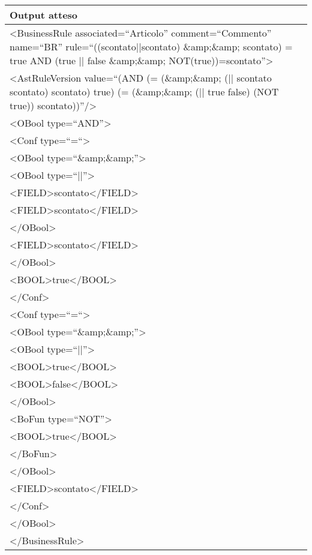 \begin{center}
\begin{tabular}{|p{11cm}|} \hline
\textbf{Output atteso}\\ \hline
\textless BusinessRule associated=``Articolo'' comment=``Commento'' name=``BR'' rule=``((scontato||scontato) \&amp;\&amp; scontato) = true AND (true || false \&amp;\&amp; NOT(true))=scontato''\textgreater \\
\textless AstRuleVersion value=``(AND (= (\&amp;\&amp; (|| scontato scontato) scontato) true) (= (\&amp;\&amp; (|| true false) (NOT true)) scontato))''/\textgreater\\
 \textless OBool type=``AND''\textgreater\\
 \textless Conf type=``=``\textgreater\\
 \textless OBool type=``\&amp;\&amp;''\textgreater \\
\textless OBool type=``||''\textgreater\\
 \textless FIELD\textgreater scontato\textless /FIELD\textgreater\\
 \textless FIELD\textgreater scontato\textless /FIELD\textgreater\\
 \textless /OBool\textgreater\\
 \textless FIELD\textgreater scontato\textless /FIELD\textgreater\\
 \textless /OBool\textgreater\\
 \textless BOOL\textgreater true\textless /BOOL\textgreater\\
 \textless /Conf\textgreater\\
 \textless Conf type=``=``\textgreater\\
 \textless OBool type=``\&amp;\&amp;''\textgreater\\
 \textless OBool type=``||''\textgreater\\
 \textless BOOL\textgreater true\textless /BOOL\textgreater\\
 \textless BOOL\textgreater false\textless /BOOL\textgreater\\
 \textless /OBool\textgreater\\
 \textless BoFun type=``NOT''\textgreater\\
 \textless BOOL\textgreater true\textless /BOOL\textgreater\\
 \textless /BoFun\textgreater\\
 \textless /OBool\textgreater\\
 \textless FIELD\textgreater scontato\textless /FIELD\textgreater\\
 \textless /Conf\textgreater\\
 \textless /OBool\textgreater\\
 \textless /BusinessRule\textgreater \\
 \hline
\end{tabular} \\
\end{center}

